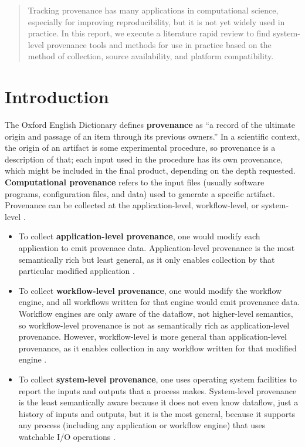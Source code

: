 \begin{abstract}
Tracking provenance has many applications in computational science, especially for improving reproducibility, but it is not yet widely used in practice.
In this report, we execute a literature rapid review to find system-level provenance tools and methods for use in practice based on the method of collection, source availability, and platform compatibility.
\end{abstract}

\section{Introduction}

The Oxford English Dictionary defines \textbf{provenance} as ``a record of the ultimate origin and passage of an item through its previous owners.''
In a scientific context, the origin of an artifact is some experimental procedure, so provenance is a description of that;
each input used in the procedure has its own provenance, which might be included in the final product, depending on the depth requested.
\textbf{Computational provenance} refers to the input files (usually software programs, configuration files, and data) used to generate a specific artifact.
Provenance can be collected at the application-level, workflow-level, or system-level \cite{muniswamy-reddy_layering_2009,freire_provenance_2008}.

\begin{itemize}
\item
To collect \textbf{application-level provenance}, one would modify each application to emit provenace data.
Application-level provenance is the most semantically rich but least general, as it only enables collection by that particular modified application \cite{muniswamy-reddy_layering_2009}.

\item To collect \textbf{workflow-level provenance}, one would modify the workflow engine, and all workflows written for that engine would emit provenance data.
Workflow engines are only aware of the dataflow, not higher-level semantics, so workflow-level provenance is not as semantically rich as application-level provenance.
However, workflow-level is more general than application-level provenance, as it enables collection in any workflow written for that modified engine \cite{freire_provenance_2008}.

\item
To collect \textbf{system-level provenance}, one uses operating system facilities to report the inputs and outputs that a process makes.
System-level provenance is the least semantically aware because it does not even know dataflow, just a history of inputs and outputs, but it is the most general, because it supports any process (including any application or workflow engine) that uses watchable I/O operations \cite{freire_provenance_2008}.
\end{itemize}

